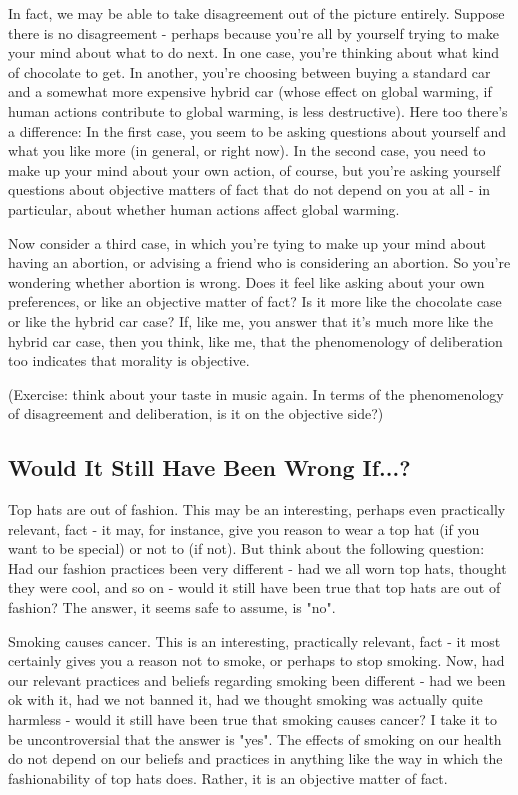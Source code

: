 In fact, we may be able to take disagreement out of the picture entirely. Suppose 
there is no disagreement - perhaps because you're all by yourself trying to make your 
mind about what to do next. In one case, you're thinking about what kind of chocolate 
to get. In another, you're choosing between buying a standard car and a somewhat 
more expensive hybrid car (whose effect on global warming, if human actions 
contribute to global warming, is less destructive). Here too there's a difference: In the 
first case, you seem to be asking questions about yourself and what you like more (in 
general, or right now). In the second case, you need to make up your mind about your 
own action, of course, but you're asking yourself questions about objective matters of 
fact that do not depend on you at all - in particular, about whether human actions affect 
global warming.  

Now consider a third case, in which you're tying to make up your mind about 
having an abortion, or advising a friend who is considering an abortion. So you're 
wondering whether abortion is wrong. Does it feel like asking about your own 
preferences, or like an objective matter of fact? Is it more like the chocolate case or like 
the hybrid car case? If, like me, you answer that it's much more like the hybrid car case, 
then you think, like me, that the phenomenology of deliberation too indicates that 
morality is objective.   

(Exercise: think about your taste in music again. In terms of the phenomenology of 
disagreement and deliberation, is it on the objective side?) 
 
\subsection{Would It Still Have Been Wrong If...?} 
Top hats are out of fashion. This may be an interesting, perhaps even practically 
relevant, fact - it may, for instance, give you reason to wear a top hat (if you want to be 
special) or not to (if not). But think about the following question: Had our fashion 
practices been very different - had we all worn top hats, thought they were cool, and so 
on - would it still have been true that top hats are out of fashion? The answer, it seems 
safe to assume, is "no".

Smoking causes cancer. This is an interesting, practically relevant, fact - it most 
certainly gives you a reason not to smoke, or perhaps to stop smoking. Now, had our 
relevant practices and beliefs regarding smoking been different - had we been ok with it, 
had we not banned it, had we thought smoking was actually quite harmless - would it 
still have been true that smoking causes cancer? I take it to be uncontroversial that the 
answer is "yes". The effects of smoking on our health do not depend on our beliefs and 
practices in anything like the way in which the fashionability of top hats does. Rather, it 
is an objective matter of fact.  

